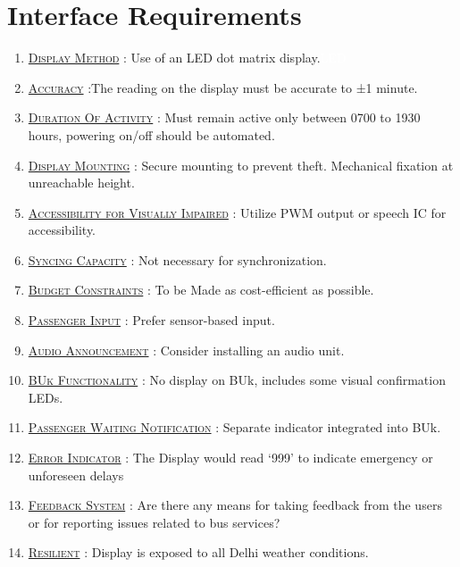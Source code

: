 \section{Interface Requirements}

\begin{enumerate}
    \item {}\underline{\textsc{Display Method}} : Use of an \gls{LED dot matrix display}.{\tiny \textcolor{white}{\ac{LED}}}

    \item \underline{\textsc{Accuracy}} :The reading on the display must be accurate to ±1 minute.

    \item \underline{\textsc{Duration Of Activity}} : Must remain active only between 0700 to 1930 hours, powering on/off should be automated.

    \item {}\underline{\textsc{Display Mounting}} : Secure mounting to prevent theft. Mechanical fixation at unreachable height.

    \item \underline{\textsc{Accessibility for Visually Impaired}} :  Utilize \ac{PWM} output or speech IC for accessibility.

    \item {}\underline{\textsc{Syncing Capacity}} : Not necessary for synchronization.

    \item {}\underline{\textsc{Budget Constraints}} : To be Made as cost-efficient as possible.

    \item {}\underline{\textsc{Passenger Input}} : Prefer sensor-based input.

    \item \underline{\textsc{Audio Announcement}} : Consider installing an \gls{audio unit}.

    \item {}\underline{\textsc{\ac{BUk} Functionality}} : No display on \ac{BUk}, includes some visual confirmation LEDs.

    \item \underline{\textsc{Passenger Waiting Notification}} : Separate indicator integrated into BUk.

    \item {}\underline{\textsc{Error Indicator}} : The Display would read ‘999’ to indicate emergency or unforeseen delays

    \item \underline{\textsc{Feedback System}} : Are there any means for taking feedback from the users or for reporting issues related to bus services?

    \item \underline{\textsc{Resilient}} : Display is exposed to all Delhi weather conditions.

\end{enumerate}